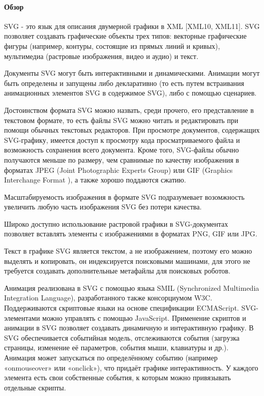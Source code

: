 \paragraph{Обзор}

SVG - это язык для описания двумерной графики в XML [XML10, XML11]. SVG позволяет создавать графические объекты трех типов: векторные графические фигуры (например, контуры, состоящие из прямых линий и кривых), мультимедиа (растровые изображения, видео и аудио) и текст.

Документы SVG могут быть интерактивными и динамическими. Анимации могут быть определены и запущены либо декларативно (то есть путем встраивания анимационных элементов SVG в содержимое SVG), либо с помощью сценариев.

Достоинством формата SVG можно назвать, среди прочего, его представление в текстовом формате, то есть файлы SVG можно читать и редактировать при помощи обычных текстовых редакторов. При просмотре документов, содержащих SVG-графику, имеется доступ к просмотру кода просматриваемого файла и возможность сохранения всего документа. Кроме того, SVG-файлы обычно получаются меньше по размеру, чем сравнимые по качеству изображения в форматах JPEG (Joint Photographic Experts Group) или GIF (Graphics Interchange Format ), а также хорошо поддаются сжатию.

Масштабируемость изображения в формате SVG подразумевает возомжность увеличить любую часть изображения SVG без потери качества.

Широко доступно использование растровой графики в SVG-документах позволяет вставлять элементы с изображениями в форматах PNG, GIF или JPG.

Текст в графике SVG является текстом, а не изображением, поэтому его можно выделять и копировать, он индексируется поисковыми машинами, для этого не требуется создавать дополнительные метафайлы для поисковых роботов.

Анимация реализована в SVG с помощью языка SMIL (Synchronized Multimedia Integration Language), разработанного также консорциумом W3C. Поддерживаются скриптовые языки на основе спецификации ECMAScript. SVG-элементами можно управлять с помощью JavaScript. Применение скриптов и анимации в SVG позволяет создавать динамичную и интерактивную графику. В SVG обеспечивается событийная модель, отслеживаются события (загрузка страницы, изменение её параметров, события мыши, клавиатуры и др.). Анимация может запускаться по определённому событию (например «onmouseover» или «onclick»), что придаёт графике интерактивность. У каждого элемента есть свои собственные события, к которым можно привязывать отдельные скрипты.


